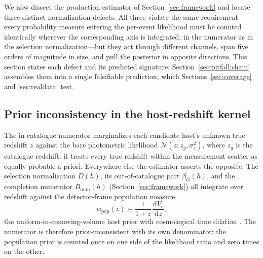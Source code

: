 We now dissect the production estimator of Section~\ref{sec:framework} and locate three distinct normalization defects. All three violate the same requirement---every probability measure entering the per-event likelihood must be counted identically wherever the corresponding axis is integrated, in the numerator as in the selection normalization---but they act through different channels, span five orders of magnitude in size, and pull the posterior in opposite directions. This section states each defect and its predicted signature; Section~\ref{sec:pitfall:chain} assembles them into a single falsifiable prediction, which Sections~\ref{sec:coverage} and \ref{sec:realdata} test.

\subsection{Prior inconsistency in the host-redshift kernel}
\label{sec:pitfall:kernel}

The in-catalogue numerator marginalizes each candidate host's unknown true redshift $z$ against the bare photometric likelihood $\mathcal{N}(z;z_g,\sigma_z^2)$, where $z_g$ is the catalogue redshift: it treats every true redshift within the measurement scatter as equally probable a priori. Everywhere else the estimator asserts the opposite. The selection normalization $D(h)$, its out-of-catalogue part $\beta_{\bar{G}}(h)$, and the completion numerator $B_{\mathrm{num}}(h)$ (Section~\ref{sec:framework}) all integrate over redshift against the detector-frame population measure
\begin{equation}
  w_{\mathrm{pop}}(z) \equiv \frac{1}{1+z}\,\frac{\mathrm{d}V_{\mathrm{c}}}{\mathrm{d}z},
  \label{eq:pitfall:wpop}
\end{equation}
the uniform-in-comoving-volume host prior with cosmological time dilation \citep{Gray:2019ksv,Mandel:2018mve}. The numerator is therefore prior-inconsistent with its own denominator: the population prior is counted once on one side of the likelihood ratio and zero times on the other.

